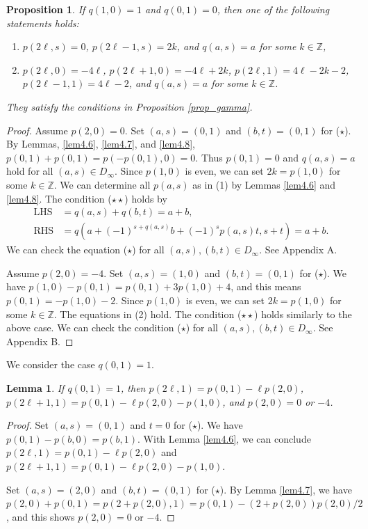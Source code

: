 \documentclass[12pt]{amsart}
\newtheorem{prop}[thm]{Proposition}
\newtheorem{lemm}[thm]{Lemma}
\theoremstyle{definition}
\newcommand{\Z}{\mathbb{Z}}
\begin{document}
\begin{prop}\label{prop10}
  If $q(1,0)=1$ and $q(0,1)=0$, then one of the following statements holds:
  \begin{enumerate}[{\rm (1)}]
    \item 
    $p(2\ell,s)= 0$,
    $p(2\ell-1,s) = 2k$, and
    $q(a,s)=a$ 
    for some $k\in \Z$,
    \item 
    $p(2\ell,0)= -4\ell$,
    $p(2\ell+1,0) = -4\ell+2k$,
    $p(2\ell,1) = 4\ell-2k-2$,
    $p(2\ell-1,1) =4\ell-2$, and
    $q(a,s)=a$
    for some $k\in \Z$.
  \end{enumerate}
  They satisfy the conditions in Proposition \ref{prop_gamma}.
\end{prop}

\begin{proof}
  Assume $p(2,0)=0$.
  Set $(a,s)=(0,1)$ and $(b,t)=(0,1)$ for ($\star$).
  By Lemmas, \ref{lem4.6}, \ref{lem4.7}, and \ref{lem4.8},
  $p(0,1)+p(0,1)=p(-p(0,1),0)=0$.
  Thus $p(0,1)=0$ and $q(a,s)=a$ hold for all
  $(a,s)\in D_\infty$.
  Since $p(1,0)$ is even, we can set $2k=p(1,0)$ for some $k\in\Z$. 
  We can determine all $p(a,s)$ as in (1)
  by Lemmas \ref{lem4.6} and \ref{lem4.8}.
  The condition ($\star\star$) holds by
  \begin{align*}
    \text{LHS} &= q(a,s)+q(b,t)=a+b,\\
    \text{RHS} &= q(a+(-1)^{s+q(a,s)}b+(-1)^sp(a,s)t,s+t)=a+b.
  \end{align*}
  We can check the equation ($\star$) for all $(a,s),(b,t)\in D_\infty$.
  See Appendix A.

  Assume $p(2,0)=-4$.
  Set $(a,s)=(1,0)$ and $(b,t)=(0,1)$ for ($\star$).
  We have $p(1,0)-p(0,1)=p(0,1)+3p(1,0)+4$,
  and this means $p(0,1)=-p(1,0)-2$.
  Since $p(1,0)$ is even, we can set $2k=p(1,0)$ for some $k\in\Z$.
  The equations in (2) hold.
  The condition ($\star\star$) holds similarly to the above case.
  We can check the condition ($\star$) for all $(a,s),(b,t)\in D_\infty$.
  See Appendix B.
\end{proof}

We consider the case $q(0,1)=1$.

\begin{lemm}\label{lem4.10}
  If $q(0,1)=1$, then
  $p(2\ell,1)= p(0,1)-\ell p(2,0)$,
  $p(2\ell+1,1)= p(0,1)-\ell p(2,0)-p(1,0)$,
  and $p(2,0)=0$ or $-4$.
\end{lemm}

\begin{proof}
  Set $(a,s)=(0,1)$ and $t=0$ for ($\star$).
  We have $p(0,1)-p(b,0)=p(b,1)$.
  With Lemma \ref{lem4.6}, we can conclude
  $p(2\ell,1)= p(0,1)-\ell p(2,0)$ and
  $p(2\ell+1,1)= p(0,1)-\ell p(2,0)-p(1,0)$.
  
  Set $(a,s)=(2,0)$ and $(b,t)=(0,1)$ for ($\star$).
  By Lemma \ref{lem4.7},
  we have $p(2,0)+p(0,1)=p(2+p(2,0),1)=p(0,1)-(2+p(2,0))p(2,0)/2$,
  and this shows $p(2,0)=0$ or $-4$.
\end{proof}
\end{document}
